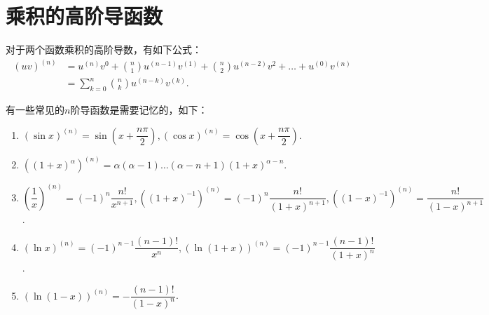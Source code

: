 \section{乘积的高阶导函数}

\begin{theorem}[Leibniz公式]
	对于两个函数乘积的高阶导数，有如下公式：
	\begin{equation}
		\begin{split}
		(uv)^{(n)} & =u^{(n)}v^0+{n\choose 1}u^{(n-1)}v^{(1)}+{n\choose 2}u^{(n-2)}v^{2}+\dots+u^{(0)}v^{(n)} \\ & =\displaystyle\sum_{k=0}^{n}{n\choose k}u^{(n-k)}v^{(k)}.
		\end{split}
	\end{equation}

\end{theorem}

有一些常见的$n$阶导函数是需要记忆的，如下：
\begin{corollary}
	\begin{enumerate}
		\item $(\sin{x})^{(n)}=\sin{(x+\dfrac{n\pi}{2})},(\cos{x})^{(n)}=\cos{(x+\dfrac{n\pi}{2})}$.
		\item $\left((1+x)^{\alpha}\right)^{(n)}=\alpha(\alpha-1)\dots(\alpha-n+1)(1+x)^{\alpha-n}$.
		\item $\left(\dfrac{1}{x}\right)^{(n)}=(-1)^n \dfrac{n!}{x^{n+1}},\left((1+x)^{-1}\right)^{(n)}=(-1)^n\dfrac{n!}{(1+x)^{n+1}},\left((1-x)^{-1}\right)^{(n)}=\dfrac{n!}{(1-x)^{n+1}}$.
		\item $(\ln{x})^{(n)}=(-1)^{n-1}\dfrac{(n-1)!}{x^n},\left(\ln{(1+x)}\right)^{(n)}=(-1)^{n-1}\dfrac{(n-1)!}{(1+x)^n}$.
		\item $\left(\ln{(1-x)}\right)^{(n)}=-\dfrac{(n-1)!}{(1-x)^n}$.
	\end{enumerate}
\end{corollary}

